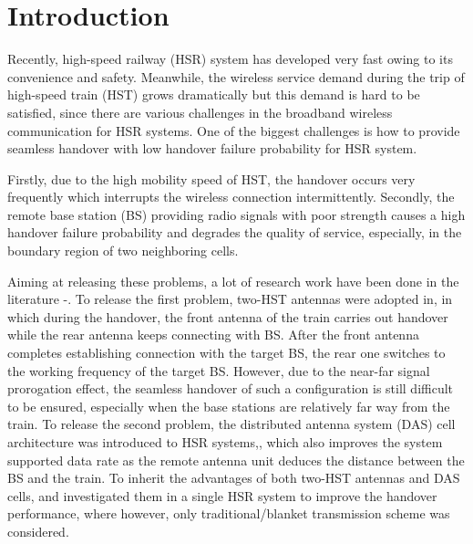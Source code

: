 \documentclass[a4paper,twocolumn,10pt]{IEEEtran}
\begin{document}
\section{Introduction}

Recently, high-speed railway (HSR) system has developed very fast owing to its convenience and safety. Meanwhile, the wireless service demand during the trip of high-speed train (HST) grows dramatically but this demand is hard to be satisfied, since there are various challenges in the broadband wireless communication for HSR systems\textcolor[rgb]{0,0,0}{\cite{HSR}}. One of the biggest challenges is how to provide seamless handover with low handover failure probability for HSR system.

Firstly, due to the high mobility speed of HST, the handover occurs very frequently which interrupts the wireless connection intermittently. Secondly, the remote base station (BS) providing radio signals with poor strength causes a high handover failure probability and degrades the quality of service, especially, in the boundary region of two neighboring cells.

Aiming at releasing these problems, a lot of research work have been done in the literature\textcolor[rgb]{0,0,0}{\cite{Seamless} -\cite{DualB}}. To release the first problem, two-HST antennas were adopted in\textcolor[rgb]{0,0,0}{\cite{Seamless}}, in which during the handover, the front antenna of the train carries out handover while the rear antenna keeps connecting with BS. After the front antenna completes establishing connection with the target BS, the rear one switches to the working frequency of the target BS. However, due to the near-far signal prorogation effect, the seamless handover of such a configuration is still difficult to be ensured, especially when the base stations are relatively far way from the train. To release the second problem, the distributed antenna system (DAS) cell architecture was introduced to HSR systems\textcolor[rgb]{0,0,0}{\cite{RAU2},\cite{RAU}}, which also improves the system supported data rate as the remote antenna unit deduces the distance between the BS and the train. To inherit the advantages of both two-HST antennas and DAS cells,\textcolor[rgb]{0,0,0}{\cite{DualA}} and\textcolor[rgb]{0,0,0}{\cite{DualB}} investigated them in a single  HSR system to improve the handover performance, where however, only traditional/blanket transmission scheme was considered.
\end{document}
